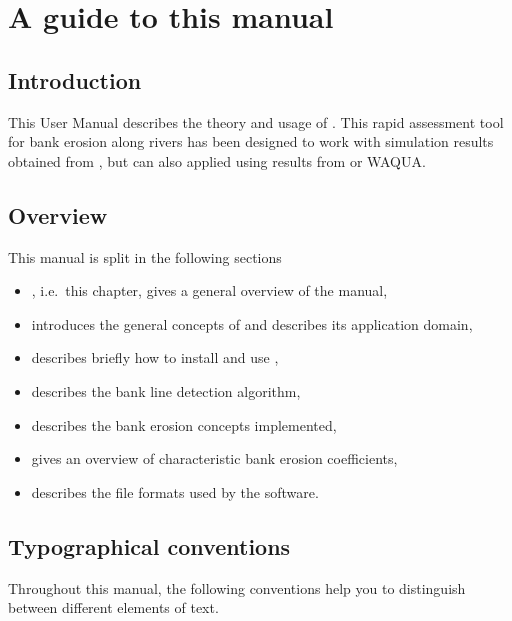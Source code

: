 \chapter{A guide to this manual} \label{Chp:Guide}

\section{Introduction}
This User Manual describes the theory and usage of \dfastbe.
This rapid assessment tool for bank erosion along rivers has been designed to work with simulation results obtained from \dflowfm, but can also applied using results from \dflow or WAQUA.

\section{Overview}
This manual is split in the following sections

\begin{itemize}
\item {}, i.e.~this chapter, gives a general overview of the manual,
\item {} introduces the general concepts of \dfastbe and describes its application domain,
\item {} describes briefly how to install and use \dfastbe,
\item {} describes the bank line detection algorithm,
\item {} describes the bank erosion concepts implemented,
\item {} gives an overview of characteristic bank erosion coefficients,
\item {} describes the file formats used by the software.
\end{itemize}

\section{Typographical conventions}
Throughout this manual, the following conventions help you to distinguish between different elements of text.


